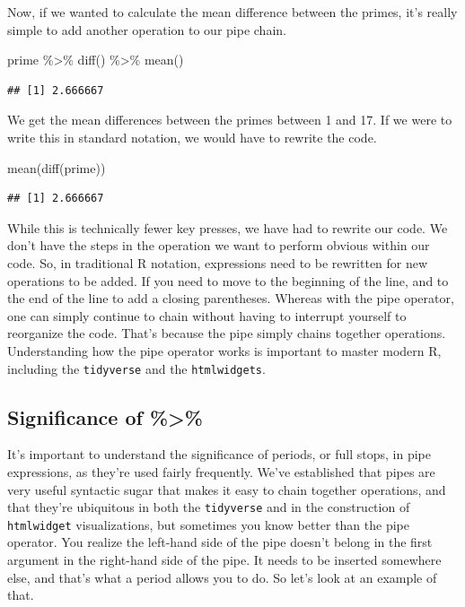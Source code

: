 \documentclass[
]{article}
\newenvironment{Shaded}{\begin{snugshade}}{\end{snugshade}}
\newcommand{\FunctionTok}[1]{\textcolor[rgb]{0.00,0.00,0.00}{#1}}
\newcommand{\NormalTok}[1]{#1}
\newcommand{\SpecialCharTok}[1]{\textcolor[rgb]{0.00,0.00,0.00}{#1}}
\begin{document}
Now, if we wanted to calculate the mean difference between the primes, it's really simple to add another operation to our pipe chain.

\begin{Shaded}
\begin{Highlighting}[]
\NormalTok{prime }\SpecialCharTok{\%\textgreater{}\%}
  \FunctionTok{diff}\NormalTok{() }\SpecialCharTok{\%\textgreater{}\%}
  \FunctionTok{mean}\NormalTok{()}
\end{Highlighting}
\end{Shaded}

\begin{verbatim}
## [1] 2.666667
\end{verbatim}

We get the mean differences between the primes between 1 and 17. If we were to write this in standard notation, we would have to rewrite the code.

\begin{Shaded}
\begin{Highlighting}[]
\FunctionTok{mean}\NormalTok{(}\FunctionTok{diff}\NormalTok{(prime))}
\end{Highlighting}
\end{Shaded}

\begin{verbatim}
## [1] 2.666667
\end{verbatim}

While this is technically fewer key presses, we have had to rewrite our code. We don't have the steps in the operation we want to perform obvious within our code. So, in traditional R notation, expressions need to be rewritten for new operations to be added. If you need to move to the beginning of the line, and to the end of the line to add a closing parentheses. Whereas with the pipe operator, one can simply continue to chain without having to interrupt yourself to reorganize the code. That's because the pipe simply chains together operations. Understanding how the pipe operator works is important to master modern R, including the \texttt{tidyverse} and the \texttt{htmlwidgets}.

\hypertarget{significance-of}{%
\subsection{Significance of \%\textgreater\%}\label{significance-of}}

It's important to understand the significance of periods, or full stops, in pipe expressions, as they're used fairly frequently. We've established that pipes are very useful syntactic sugar that makes it easy to chain together operations, and that they're ubiquitous in both the \texttt{tidyverse} and in the construction of \texttt{htmlwidget} visualizations, but sometimes you know better than the pipe operator. You realize the left-hand side of the pipe doesn't belong in the first argument in the right-hand side of the pipe. It needs to be inserted somewhere else, and that's what a period allows you to do. So let's look at an example of that.
\end{document}
